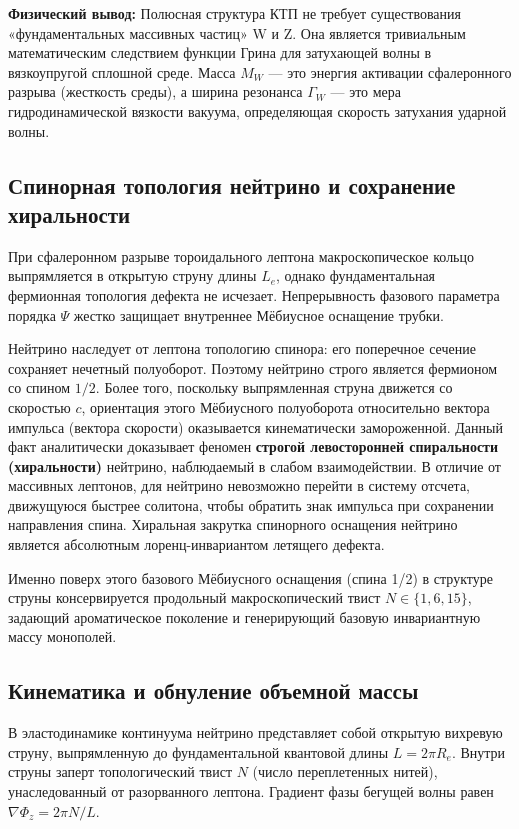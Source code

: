 \documentclass[11pt,a4paper]{article}
\begin{document}
	\textbf{Физический вывод:} Полюсная структура КТП не требует существования «фундаментальных массивных частиц» W и Z. Она является тривиальным математическим следствием функции Грина для затухающей волны в вязкоупругой сплошной среде. Масса $M_W$ — это энергия активации сфалеронного разрыва (жесткость среды), а ширина резонанса $\Gamma_W$ — это мера гидродинамической вязкости вакуума, определяющая скорость затухания ударной волны. 
	
	\subsection{Спинорная топология нейтрино и сохранение хиральности}
	При сфалеронном разрыве тороидального лептона макроскопическое кольцо выпрямляется в открытую струну длины $L_e$, однако фундаментальная фермионная топология дефекта не исчезает. Непрерывность фазового параметра порядка $\Psi$ жестко защищает внутреннее Мёбиусное оснащение трубки. 
	
	Нейтрино наследует от лептона топологию спинора: его поперечное сечение сохраняет нечетный полуоборот. Поэтому нейтрино строго является фермионом со спином $1/2$. Более того, поскольку выпрямленная струна движется со скоростью $c$, ориентация этого Мёбиусного полуоборота относительно вектора импульса (вектора скорости) оказывается кинематически замороженной. 
	Данный факт аналитически доказывает феномен \textbf{строгой левосторонней спиральности (хиральности)} нейтрино, наблюдаемый в слабом взаимодействии. В отличие от массивных лептонов, для нейтрино невозможно перейти в систему отсчета, движущуюся быстрее солитона, чтобы обратить знак импульса при сохранении направления спина. Хиральная закрутка спинорного оснащения нейтрино является абсолютным лоренц-инвариантом летящего дефекта.
	
	Именно поверх этого базового Мёбиусного оснащения (спина 1/2) в структуре струны консервируется продольный макроскопический твист $N \in \{1, 6, 15\}$, задающий ароматическое поколение и генерирующий базовую инвариантную массу монополей.	
	
	\subsection{Кинематика и обнуление объемной массы}
	В эластодинамике континуума нейтрино представляет собой открытую вихревую струну, выпрямленную до фундаментальной квантовой длины $L = 2\pi R_e$. Внутри струны заперт топологический твист $N$ (число переплетенных нитей), унаследованный от разорванного лептона. Градиент фазы бегущей волны равен $\nabla \Phi_z = 2\pi N / L$.
	
\end{document}
